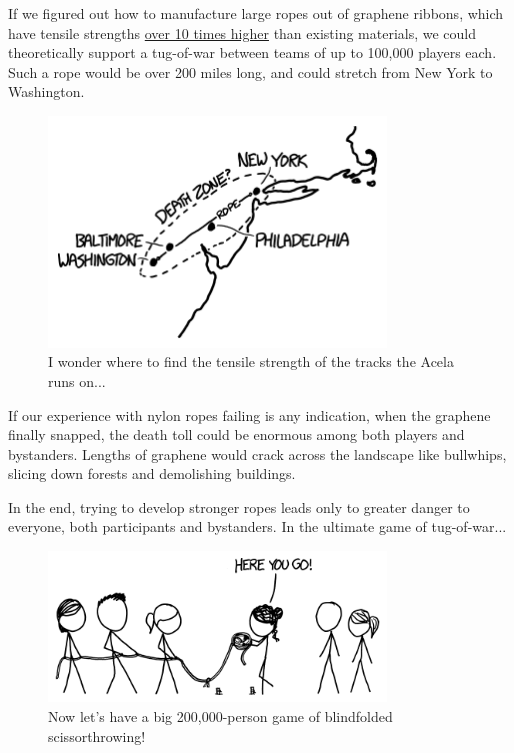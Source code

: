 {{If we figured out how to manufacture large ropes out of graphene ribbons, which have tensile strengths \href{http://arxiv.org/pdf/0709.0992.pdf}{over 10 times higher} than existing materials, we could theoretically support a tug-of-war between teams of up to 100,000 players each. Such a rope would be over 200 miles long, and could stretch from New York to Washington.}

\begin{figure}[!htbp]
\centering
\includegraphics[scale=0.5, max width=0.8\textwidth]{imgs/a/127/map.png}
\caption{I wonder where to find the tensile strength of the tracks the Acela runs on...}
\end{figure}

{If our experience with nylon ropes failing is any indication, when the graphene finally snapped, the death toll could be enormous among both players and bystanders. Lengths of graphene would crack across the landscape like bullwhips, slicing down forests and demolishing buildings.}

{In the end, trying to develop stronger ropes leads only to greater danger to everyone, both participants and bystanders. In the ultimate game of tug-of-war...}

\begin{figure}[!htbp]
\centering
\includegraphics[scale=0.5, max width=0.8\textwidth]{imgs/a/127/end.png}
\caption{Now let's have a big 200,000-person game of blindfolded scissorthrowing!}
\end{figure}

}
